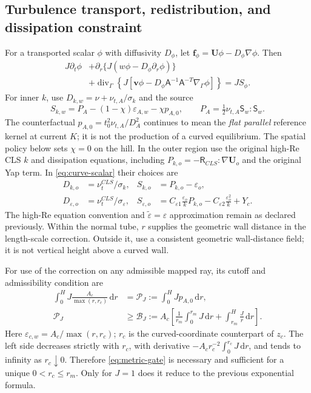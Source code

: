 \documentclass[11pt,a4paper]{article}
\numberwithin{equation}{section}
\newcommand{\dd}{\mathrm{d}}
\newcommand{\eps}{\varepsilon}
\newcommand{\et}{\widetilde{\varepsilon}}
\newcommand{\R}{\mathsf{R}}
\newcommand{\Sm}{\mathsf{S}}
\newcommand{\Aref}{A_c}
\newcommand{\EAw}{\eps_{A,w}}
\newcommand{\ECw}{\eps_{c,w}}
\begin{document}
\subsection{Turbulence transport, redistribution, and dissipation constraint}
For a transported scalar $\phi$ with diffusivity $D_\phi$, let
$\bm f_\phi=\bm U\phi-D_\phi\nabla\phi$. Then
\begin{equation}
 \boxed{\begin{aligned}
 J\partial_t\phi
 &+\partial_r\{J(w\phi-D_\phi\partial_r\phi)\}\\
 &+\operatorname{div}_\Gamma\left\{
 J[\bm v\phi-D_\phi \mathsf A^{-1}\mathsf A^{-T}\nabla_\Gamma\phi]\right\}
 =JS_\phi.
 \end{aligned}}
 \label{eq:curve-scalar}
\end{equation}
For inner $k$, use $D_{k,w}=\nu+\nu_{t,A}/\sigma_k$ and the source
\begin{equation}
 S_{k,w}=P_A-(1-\chi)\EAw-\chi p_{A,0},
 \qquad P_A=\tfrac12\nu_{t,A}\Sm_w:\Sm_w.
 \label{eq:curve-ksource}
\end{equation}
The counterfactual $p_{A,0}=t_0^2\nu_{t,A}/D_A^2$ continues to mean
the \emph{flat parallel} reference kernel at current $K$; it is not
the production of a curved equilibrium. The spatial policy below
sets $\chi=0$ on the hill. In the outer region use the original
high-Re CLS $k$ and dissipation equations, including
$P_{k,o}=-\R_{CLS}:\nabla\bm U_o$ and the original Yap term. In
\cref{eq:curve-scalar} their choices are
\begin{equation}
 \begin{aligned}
 D_{k,o}&=\nu_t^{CLS}/\sigma_k,&S_{k,o}&=P_{k,o}-\eps_o,\\
 D_{\eps,o}&=\nu_t^{CLS}/\sigma_\eps,&
 S_{\eps,o}&=C_{\eps1}\frac{\eps_o}{k}P_{k,o}
 -C_{\eps2}\frac{\eps_o^2}{k}+Y_c.
 \end{aligned}
 \label{eq:curve-outer-scalars}
\end{equation}
The high-Re equation convention and $\et=\eps$ approximation remain
as declared previously. Within the normal tube, $r$ supplies the
geometric wall distance in the length-scale correction. Outside it,
use a consistent geometric wall-distance field; it is not vertical
height above a curved wall.

For use of the correction on any admissible mapped ray, its cutoff
and admissibility condition are
\begin{align}
 \int_0^H J\frac{\Aref}{\max(r,r_c)}\,\dd r
 &=\mathcal P_J:=\int_0^H Jp_{A,0}\,\dd r,
 \label{eq:metric-cutoff}\\
 \mathcal P_J&\geq\mathcal B_J:=\Aref\left[
 \frac1{r_m}\int_0^{r_m}J\,\dd r
 +\int_{r_m}^H\frac{J}{r}\,\dd r\right].
 \label{eq:metric-gate}
\end{align}
Here $\ECw=\Aref/\max(r,r_c)$; $r_c$ is the curved-coordinate
counterpart of $z_c$. The left side decreases strictly with $r_c$,
with derivative $-\Aref r_c^{-2}\int_0^{r_c}J\,\dd r$, and tends
to infinity as $r_c\downarrow0$. Therefore \cref{eq:metric-gate}
is necessary and sufficient for a unique $0<r_c\leq r_m$. Only for
$J=1$ does it reduce to the previous exponential formula.
\end{document}
